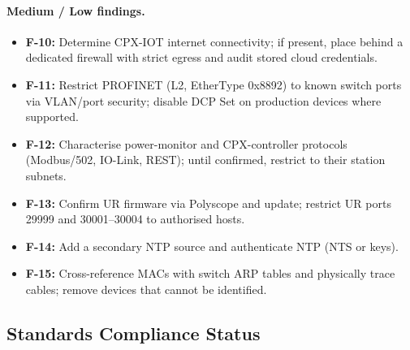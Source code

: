 \documentclass{report}
\begin{document}
\paragraph{Medium / Low findings.}
\begin{itemize}[nosep]
  \item \textbf{F-10:} Determine CPX-IOT internet connectivity; if present, place behind a dedicated firewall with strict egress and audit stored cloud credentials.
  \item \textbf{F-11:} Restrict PROFINET (L2, EtherType 0x8892) to known switch ports via VLAN/port security; disable DCP Set on production devices where supported.
  \item \textbf{F-12:} Characterise power-monitor and CPX-controller protocols (Modbus/502, IO-Link, REST); until confirmed, restrict to their station subnets.
  \item \textbf{F-13:} Confirm UR firmware via Polyscope and update; restrict UR ports 29999 and 30001--30004 to authorised hosts.
  \item \textbf{F-14:} Add a secondary NTP source and authenticate NTP (NTS or keys).
  \item \textbf{F-15:} Cross-reference MACs with switch ARP tables and physically trace cables; remove devices that cannot be identified.
\end{itemize}

\subsection{Standards Compliance Status}
\end{document}
